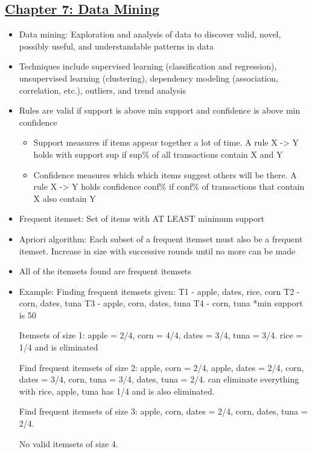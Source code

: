 \documentclass[8pt,landscape,a4paper, fleqn, dvipsnames]{extarticle}
\begin{document}
\begin{multicols*}{4}
\section*{\ul{Chapter 7: Data Mining}}
\begin{itemize}
    \item Data mining: Exploration and analysis of data to discover valid, novel, possibly useful, and understandable patterns in data
    \item Techniques include supervised learning (classification and regression), unsupervised learning (clustering), dependency modeling (association, correlation, etc.), outliers, and trend analysis
    \item Rules are valid if support is above min support and confidence is above min confidence
    \begin{itemize}
        \item Support measures if items appear together a lot of time. A rule X -> Y holds with support sup if sup\% of all transactions contain X and Y 
        \item Confidence measures which which items suggest others will be there. A rule X -> Y holds confidence conf\% if conf\% of transactions that contain X also contain Y
    \end{itemize}
    \item Frequent itemset: Set of items with AT LEAST minimum support
    \item Apriori algorithm: Each subset of a frequent itemset must also be a frequent itemset. Increase in size with successive rounds until no more can be made
    \item All of the itemsets found are frequent itemsets
    \item Example: Finding frequent itemsets given:
T1 - apple, dates, rice, corn
T2 - corn, dates, tuna
T3 - apple, corn, dates, tuna
T4 - corn, tuna
*min support is 50%

Itemsets of size 1:
{apple} = 2/4, {corn} = 4/4, {dates} = 3/4, {tuna} = 3/4. 
{rice} = 1/4 and is eliminated

Find frequent itemsets of size 2:
{apple, corn} = 2/4, {apple, dates} = 2/4, {corn, dates} = 3/4, {corn, tuna} = 3/4, {dates, tuna} = 2/4. 
can eliminate everything with rice, {apple, tuna} has 1/4 and is also eliminated. 

Find frequent itemsets of size 3:
{apple, corn, dates} = 2/4, {corn, dates, tuna} = 2/4.

No valid itemsets of size 4.


\end{itemize}
\end{multicols*}
\end{document}
